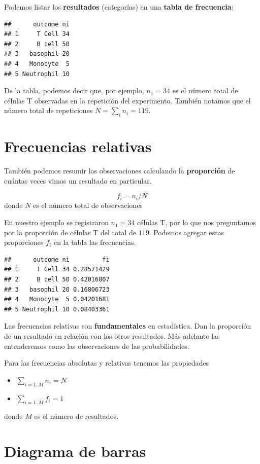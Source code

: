 \documentclass[
]{book}
\providecommand{\tightlist}{%
  \setlength{\itemsep}{0pt}\setlength{\parskip}{0pt}}
\begin{document}
Podemos listar los \textbf{resultados} (categorías) en una \textbf{tabla de frecuencia}:

\begin{verbatim}
##      outcome ni
## 1     T Cell 34
## 2     B cell 50
## 3   basophil 20
## 4   Monocyte  5
## 5 Neutrophil 10
\end{verbatim}

De la tabla, podemos decir que, por ejemplo, \(n_1=34\) es el número total de células T observadas en la repetición del experimento. También notamos que el número total de repeticiones \(N=\sum_i n_i=119\).

\hypertarget{frecuencias-relativas}{%
\section{Frecuencias relativas}\label{frecuencias-relativas}}

También podemos resumir las observaciones calculando la \textbf{proporción} de cuántas veces vimos un resultado en particular.

\[f_i=n_i/N\] donde \(N\) es el número total de observaciones

En nuestro ejemplo se registraron \(n_1=34\) células T, por lo que nos preguntamos por la proporción de células T del total de \(119\). Podemos agregar estas proporciones \(f_i\) en la tabla las frecuencias.

\begin{verbatim}
##      outcome ni         fi
## 1     T Cell 34 0.28571429
## 2     B cell 50 0.42016807
## 3   basophil 20 0.16806723
## 4   Monocyte  5 0.04201681
## 5 Neutrophil 10 0.08403361
\end{verbatim}

Las frecuencias relativas son \textbf{fundamentales} en estadística. Dan la proporción de un resultado en relación con los otros resultados. Más adelante las entenderemos como las observaciones de las probabilidades.

Para las frecuencias absolutas y relativas tenemos las propiedades

\begin{itemize}
\tightlist
\item
  \(\sum_{i=1..M} n_i = N\)
\item
  \(\sum_{i=1..M} f_i = 1\)
\end{itemize}

donde \(M\) es el número de resultados.

\hypertarget{diagrama-de-barras}{%
\section{Diagrama de barras}\label{diagrama-de-barras}}
\end{document}
